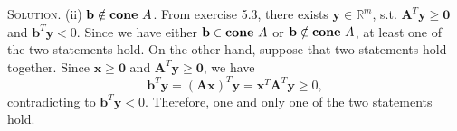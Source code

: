 \documentclass[12pt, a4paper, oneside]{ctexart}
\newenvironment{solution}{\par\noindent\textsc{Solution. }}{\\\par}
\DeclareMathOperator*{\cone}{\bf cone\,}
\begin{document}
\begin{solution}
	\newline
	(ii) $\mathbf{b} \notin \cone A$. From exercise 5.3, there exists $\mathbf{y} \in \mathbb{R}^m$, s.t. $\mathbf{A}^T \mathbf{y} \geq \mathbf{0}$ and $\mathbf{b}^T \mathbf{y} < 0$.
	\newline
	Since we have either $\mathbf{b} \in \cone A$ or $\mathbf{b} \notin \cone A$, at least one of the two statements hold. 
	\newline
	On the other hand, suppose that two statements hold together. Since $\mathbf{x} \geq \mathbf{0}$ and $\mathbf{A}^T \mathbf{y} \geq \mathbf{0}$, we have 
	\[
	\mathbf{b}^T \mathbf{y} = (\mathbf{Ax})^T \mathbf{y} = \mathbf{x}^T \mathbf{A}^T \mathbf{y} \geq 0,
	\]
	contradicting to $\mathbf{b}^T \mathbf{y} < 0$. Therefore, one and only one of the two statements hold.
\end{solution}
\end{document}
